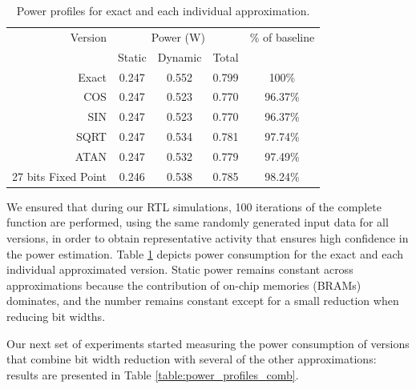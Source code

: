 \begin{table}[h]
\begin{tabular}{r c c c c}
\toprule
Version & \multicolumn{3}{c}{Power (W)} & \% of baseline\\
 & Static & Dynamic & Total &\\
\hline
Exact & 0.247 & 0.552 & 0.799 & 100\%\\
COS & 0.247 & 0.523 & 0.770 & 96.37\%\\
SIN & 0.247 & 0.523 & 0.770 & 96.37\%\\
SQRT & 0.247 & 0.534 & 0.781 & 97.74\%\\
ATAN & 0.247 & 0.532 & 0.779 & 97.49\%\\
27 bits Fixed Point & 0.246 & 0.538 & 0.785 & 98.24\%\\
\hline
\end{tabular}
\caption{Power profiles for exact and each individual approximation.}
\label{table:power_profiles}
\end{table}


\par We ensured that during our RTL simulations, 100 iterations of the complete function are performed, using the same randomly generated input data for all versions, in order to obtain representative activity that ensures high confidence in the power estimation. Table \ref{table:power_profiles} depicts power consumption for the exact and each individual approximated version. Static power remains constant across approximations because the contribution of on-chip memories (BRAMs) dominates, and the number remains constant except for a small reduction when reducing bit widths. 
\par Our next set of experiments started measuring the power consumption of versions that combine bit width reduction with several of the other approximations: results are presented in Table \ref{table:power_profiles_comb}.



